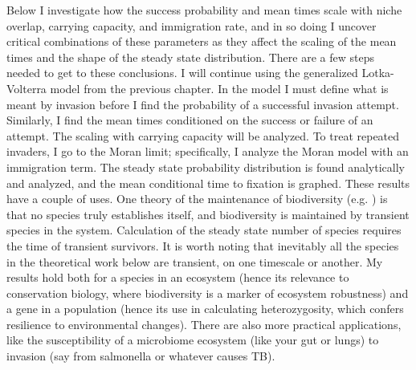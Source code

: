 Below I investigate how the success probability and mean times scale with niche overlap, carrying capacity, and immigration rate, and in so doing I uncover critical combinations of these parameters as they affect the scaling of the mean times and the shape of the steady state distribution. 
There are a few steps needed to get to these conclusions. 
I will continue using the generalized Lotka-Volterra model from the previous chapter. %
In the model I must define what is meant by invasion before I find the probability of a successful invasion attempt. 
Similarly, I find the mean times conditioned on the success or failure of an attempt. The scaling with carrying capacity will be analyzed. 
To treat repeated invaders, I go to the Moran limit; specifically, I analyze the Moran model with an immigration term. 
The steady state probability distribution is found analytically and analyzed, and the mean conditional time to fixation is graphed. 
These results have a couple of uses. 
One theory of the maintenance of biodiversity (e.g. \cite{Hubbell2001}) is that no species truly establishes itself, and biodiversity is maintained by transient species in the system. 
Calculation of the steady state number of species requires the time of transient survivors. 
It is worth noting that inevitably all the species in the theoretical work below are transient, on one timescale or another. 
My results hold both for a species in an ecosystem (hence its relevance to conservation biology, where biodiversity is a marker of ecosystem robustness) and a gene in a population (hence its use in calculating heterozygosity, which confers resilience to environmental changes). 
There are also more practical applications, like the susceptibility of a microbiome ecosystem (like your gut or lungs) to invasion (say from salmonella or whatever causes TB). %

\iffalse
Transient co-existence during the fixation/extinction process of immigrants/mutants has also been proposed as a mechanism for observed biodiversity in a number of contexts \cite{Kimura1964,Dias1996,Hubbell2001,Chesson2000,Leibold2006,Kessler2015,Vega2017}. 
The extent of this biodiversity is constrained by the interplay between the residence times of these invaders and the rate at which they appear in a settled population. 
In the previous sections we calculated the fixation times in the two species system starting from the deterministically stable fixed point. 
In this section we investigate the complementary problem of robustness of a stable population of one species with respect to an invasion of another species, arising either through mutation or immigration, and investigate the effect of niche overlap and system size on the probability and mean times of successful and failed invasions. 
\fi


